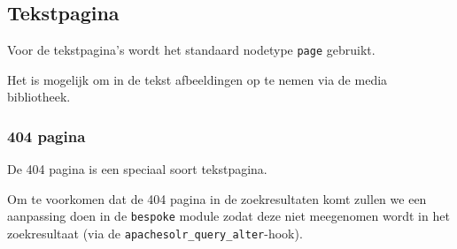 \subsection{Tekstpagina}\label{tekstpagina}

Voor de tekstpagina's wordt het standaard nodetype \texttt{page} gebruikt.

Het is mogelijk om in de tekst afbeeldingen op te nemen via de media bibliotheek.

\subsubsection{404 pagina}\label{404pagina}

De 404 pagina is een speciaal soort tekstpagina.

Om te voorkomen dat de 404 pagina in de zoekresultaten komt zullen we een aanpassing doen in de \texttt{bespoke} module zodat deze niet meegenomen wordt in het zoekresultaat (via de \texttt{apachesolr\_query\_alter}-hook).
